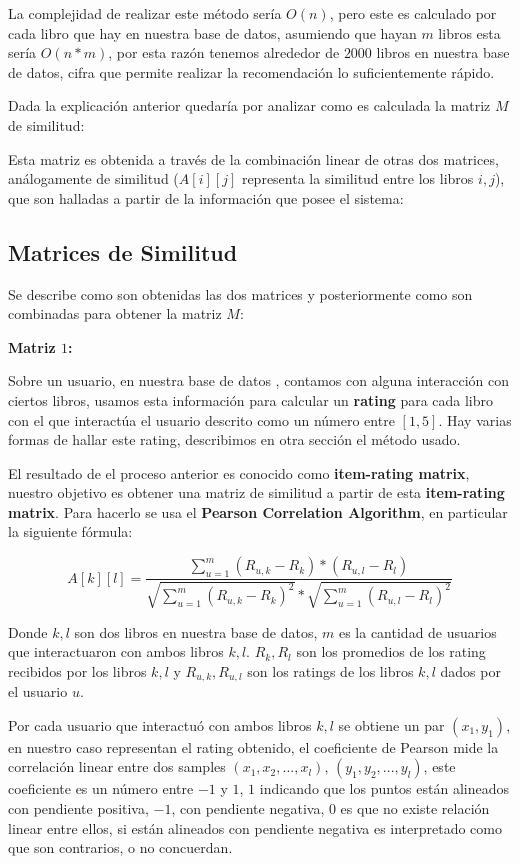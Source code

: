 \documentclass[14pt]{extarticle}
\begin{document}
La complejidad de realizar este método sería $O(n)$, pero este es calculado por cada libro que hay en nuestra base de datos, asumiendo que hayan $m$ libros esta sería $O(n * m)$, por esta razón tenemos alrededor de $2000$ libros en nuestra base de datos, cifra que permite realizar la recomendación lo suficientemente rápido.

Dada la explicación anterior quedaría por analizar como es calculada la matriz $M$ de similitud:

Esta matriz es obtenida a través de la combinación linear de otras dos matrices, análogamente de similitud ($A[i][j]$ representa la similitud entre los libros $i, j$), que son halladas a partir de la información que posee el sistema:

\subsection{Matrices de Similitud}

Se describe como son obtenidas las dos matrices y posteriormente como son combinadas para obtener la matriz $M$:

\textbf{Matriz $1$:}

Sobre un usuario, en nuestra base de datos , contamos con alguna interacción con ciertos libros, usamos esta información para calcular un \textbf{rating} para cada libro con el que interactúa el usuario descrito como un número entre $[1,5]$. Hay varias formas de hallar este rating, describimos en otra sección el método usado. 

El resultado de el proceso anterior es conocido como \textbf{item-rating matrix}, nuestro objetivo es obtener una matriz de similitud a partir de esta \textbf{item-rating matrix}. Para hacerlo se usa el \textbf{Pearson Correlation Algorithm}, en particular la siguiente fórmula:

$$A[k][l] = \frac{ \sum_{u = 1}^m (R_{u,k} - R_k)*(R_{u,l} - R_l) }{ \sqrt{\sum_{u = 1}^m (R_{u,k} - R_k)^2} * \sqrt{\sum_{u = 1}^m (R_{u,l} - R_l)^2} }$$

Donde $k, l$ son dos libros en nuestra base de datos, $m$ es la cantidad de usuarios que interactuaron con ambos libros $k, l$. $R_k,R_l$ son los promedios de los rating recibidos por los libros $k, l$ y $R_{u,k}, R_{u,l}$ son los ratings de los libros $k, l$ dados por el usuario $u$. 

Por cada usuario que interactuó con ambos libros $k,l$ se obtiene un par $(x_1, y_1)$, en nuestro caso representan el rating obtenido, el coeficiente de Pearson mide la correlación linear entre dos samples $(x_1, x_2, ..., x_l)$, $(y_1, y_2, ..., y_l)$, este coeficiente es un número entre $-1$ y $1$, $1$ indicando que los puntos están alineados con pendiente positiva, $-1$, con pendiente negativa, $0$ es que no existe relación linear entre ellos, si están alineados con pendiente negativa es interpretado como que son contrarios, o no concuerdan.
\end{document}
